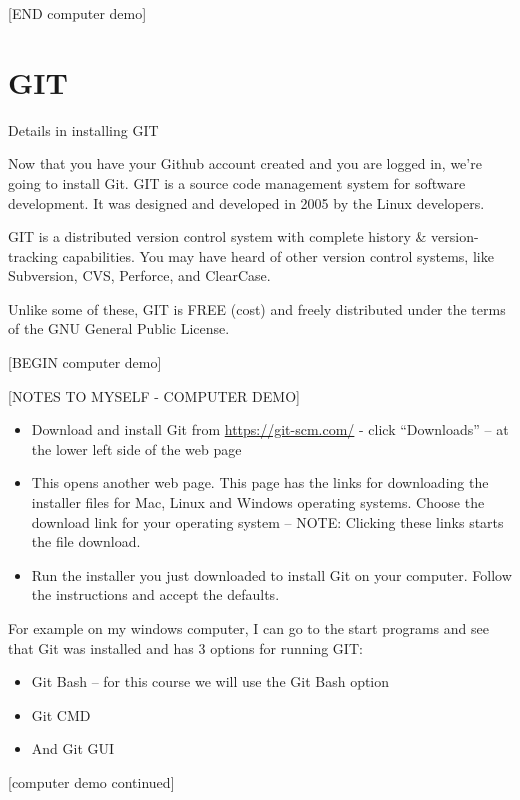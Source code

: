 \documentclass[
]{book}
\providecommand{\tightlist}{%
  \setlength{\itemsep}{0pt}\setlength{\parskip}{0pt}}
\begin{document}
{[}END computer demo{]}

\hypertarget{git}{%
\section{GIT}\label{git}}

Details in installing GIT

Now that you have your Github account created and you are logged in, we're going to install Git. GIT is a source code management system for software development. It was designed and developed in 2005 by the Linux developers.

GIT is a distributed version control system with complete history \& version-tracking capabilities. You may have heard of other version control systems, like Subversion, CVS, Perforce, and ClearCase.

Unlike some of these, GIT is FREE (cost) and freely distributed under the terms of the GNU General Public License.

{[}BEGIN computer demo{]}

{[}NOTES TO MYSELF - COMPUTER DEMO{]}

\begin{itemize}
\tightlist
\item
  Download and install Git from \url{https://git-scm.com/} - click ``Downloads'' -- at the lower left side of the web page
\item
  This opens another web page. This page has the links for downloading the installer files for Mac, Linux and Windows operating systems. Choose the download link for your operating system -- NOTE: Clicking these links starts the file download.
\item
  Run the installer you just downloaded to install Git on your computer. Follow the instructions and accept the defaults.
\end{itemize}

For example on my windows computer, I can go to the start programs and see that Git was installed and has 3 options for running GIT:

\begin{itemize}
\tightlist
\item
  Git Bash -- for this course we will use the Git Bash option
\item
  Git CMD
\item
  And Git GUI
\end{itemize}

{[}computer demo continued{]}
\end{document}
